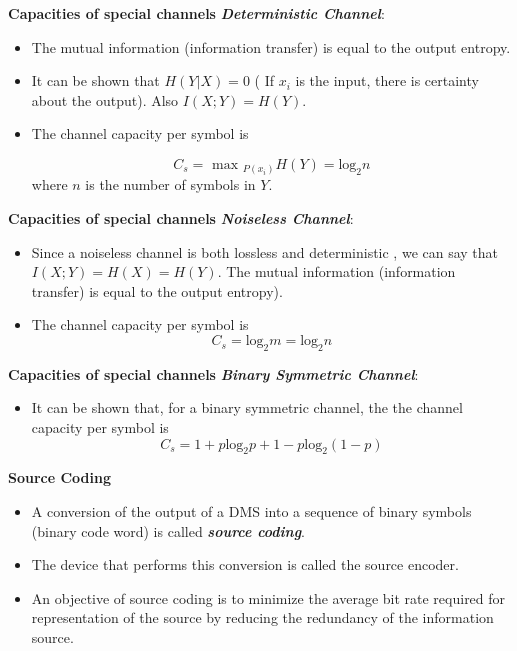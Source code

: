
\noindent \textbf{Capacities of special channels}
\textbf{\emph{Deterministic Channel}}:
\begin{itemize}
\item The mutual information (information transfer) is equal to the output entropy.
\item It can be shown that $H(Y|X) = 0$ ( If $x_i$ is the input, there is certainty about the output). Also $I(X;Y) = H(Y)$.
\item  The channel capacity per symbol is

\[ C_s = \mbox{ max }_{P(x_i)} H(Y) = \mbox{log}_2n \]
where $n$ is the number of symbols in $Y$.
\end{itemize}


\noindent \textbf{Capacities of special channels}
 \textbf{\emph{Noiseless Channel}}:
\begin{itemize}
\item Since a noiseless channel is both lossless and deterministic , we can say that $I(X;Y) = H(X) = H(Y)$.
The mutual information (information transfer) is equal to the output entropy). \item The channel capacity per symbol is
\[ C_s = \mbox{log}_2m = \mbox{log}_2n \]
\end{itemize}



\noindent \textbf{Capacities of special channels}
 \textbf{\emph{Binary Symmetric Channel}}:
\begin{itemize}
\item It can be shown that, for a binary symmetric channel, the the channel capacity per symbol is
\[ C_s = 1 + p\mbox{log}_2p  + 1-p\mbox{log}_2 (1-p)  \]
\end{itemize}



\noindent \textbf{Source Coding}
\begin{itemize}
\item A conversion of the output of a DMS into a sequence of binary symbols (binary code word) is
called \textbf{\emph{source coding}}.
\item  The device that performs this conversion is called the source encoder.
\item
An objective of source coding is to minimize the average bit rate required for representation of the
source by reducing the redundancy of the information source.
\end{itemize}



